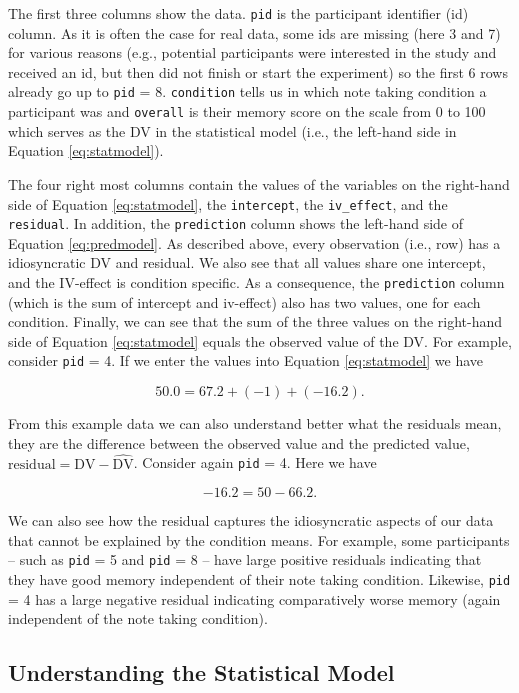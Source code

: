 \documentclass[
]{book}
\begin{document}
The first three columns show the data. \texttt{pid} is the participant identifier (id) column. As it is often the case for real data, some ids are missing (here 3 and 7) for various reasons (e.g., potential participants were interested in the study and received an id, but then did not finish or start the experiment) so the first 6 rows already go up to \texttt{pid} = 8. \texttt{condition} tells us in which note taking condition a participant was and \texttt{overall} is their memory score on the scale from 0 to 100 which serves as the DV in the statistical model (i.e., the left-hand side in Equation \eqref{eq:statmodel}).

The four right most columns contain the values of the variables on the right-hand side of Equation \eqref{eq:statmodel}, the \texttt{intercept}, the \texttt{iv\_effect}, and the \texttt{residual}. In addition, the \texttt{prediction} column shows the left-hand side of Equation \eqref{eq:predmodel}. As described above, every observation (i.e., row) has a idiosyncratic DV and residual. We also see that all values share one intercept, and the IV-effect is condition specific. As a consequence, the \texttt{prediction} column (which is the sum of intercept and iv-effect) also has two values, one for each condition. Finally, we can see that the sum of the three values on the right-hand side of Equation \eqref{eq:statmodel} equals the observed value of the DV. For example, consider \texttt{pid} = 4. If we enter the values into Equation \eqref{eq:statmodel} we have

\[
50.0 = 67.2 + (-1) + (-16.2).
\]

From this example data we can also understand better what the residuals mean, they are the difference between the observed value and the predicted value, \(\text{residual} = \text{DV} - \hat{\text{DV}}\). Consider again \texttt{pid} = 4. Here we have

\[
-16.2 = 50- 66.2.
\]

We can also see how the residual captures the idiosyncratic aspects of our data that cannot be explained by the condition means. For example, some participants -- such as \texttt{pid} = 5 and \texttt{pid} = 8 -- have large positive residuals indicating that they have good memory independent of their note taking condition. Likewise, \texttt{pid} = 4 has a large negative residual indicating comparatively worse memory (again independent of the note taking condition).

\hypertarget{understanding-the-statistical-model}{%
\subsection{Understanding the Statistical Model}\label{understanding-the-statistical-model}}
\end{document}
